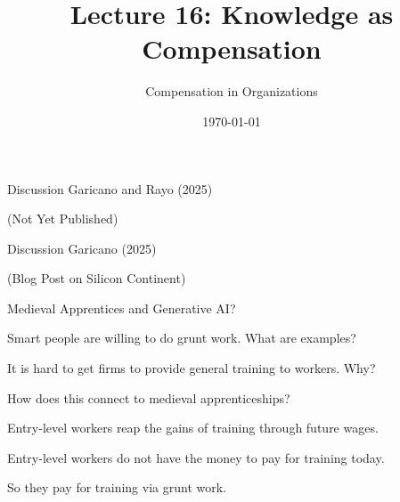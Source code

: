 \documentclass[aspectratio=169,usenames,dvipsnames]{beamer}
\title[diss]{Lecture 16: Knowledge as Compensation} %
\author{Compensation in Organizations} %
\institute[shortinst]{Jacob Kohlhepp}
\date{\today} %
\newenvironment{wideitemize}{\itemize\addtolength{\itemsep}{10pt}}{\enditemize}
\begin{document}
\begin{frame}
\titlepage %

\end{frame}

\begin{frame}{Discussion}
\centering
    \huge  Garicano and Rayo (2025)

    \normalsize (Not Yet Published)
\end{frame}


\begin{frame}{Discussion}
\centering
    \huge  Garicano (2025)

    \normalsize (Blog Post on Silicon Continent)
\end{frame}

\begin{frame}{Medieval Apprentices and Generative AI?}

\begin{wideitemize}
    \item Smart people  are willing to do grunt work. What are examples?

    \item It is hard to get firms to provide general training to workers. Why?

    \item How does this connect to medieval apprenticeships?

    \begin{wideitemize}
        \item Entry-level workers reap the gains of training through future wages.
        \item Entry-level workers do not have the money to pay for training today.
        \item So they pay for training via grunt work.
    \end{wideitemize}
    
\end{wideitemize}
\end{frame}
\end{document}

